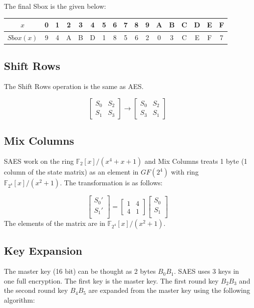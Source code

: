 \documentclass[preprint]{transcrypto}
\begin{document}
The final Sbox is the given below:
\begin{center}
\begin{tabular}{ |c|c|c|c|c|c|c|c|c|c|c|c|c|c|c|c|c| } 
 \hline
 $x$ & 0 & 1& 2& 3& 4& 5& 6& 7& 8& 9& A& B& C& D& E& F \\ \hline
 $Sbox(x)$ & 9& 4& A& B& D& 1& 8& 5& 6& 2& 0& 3& C& E& F& 7 \\ \hline
\end{tabular}
\end{center}

\subsection{Shift Rows}
The Shift Rows operation is the same as AES.

\[
    \begin{bmatrix}
    S_0 & S_2\\
    S_1 & S_3
    \end{bmatrix} \longrightarrow
    \begin{bmatrix}
    S_0 & S_2\\
    S_3 & S_1
    \end{bmatrix} 
\]

\subsection{Mix Columns}
SAES work on the ring $\mathbb{F}_2[x]/(x^4 + x +  1)$ and Mix Columns treats 1 byte (1 column of the state matrix) as an element in $GF(2^4)$ with ring $\mathbb{F}_{2^4}[x]/(x^2 + 1)$. The transformation is as follows:

\[
    \begin{bmatrix}
    S_0'\\
    S_1'\\ 
    \end{bmatrix} = 
    \begin{bmatrix}
    1 & 4 \\
    4 & 1 
    \end{bmatrix}
    \begin{bmatrix}
    S_0\\
    S_1\\ 
    \end{bmatrix}
\]
The elements of the matrix are in $\mathbb{F}_{2^4}[x]/(x^2 + 1)$.

\subsection{Key Expansion}
The master key (16 bit) can be thought as 2 bytes $B_0B_1$. SAES uses 3 keys in one full encryption. The first key is the master key. The first round key $B_2B_3$ and the second round key $B_4B_5$ are expanded from the master key using the following algorithm:
\end{document}
